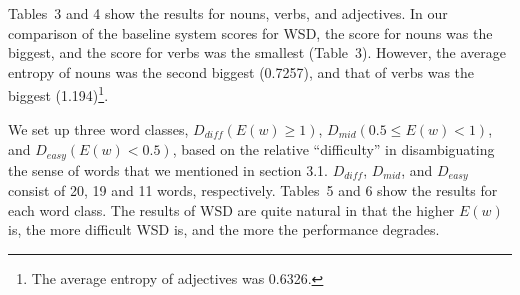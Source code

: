 \documentclass[english]{jnlp_1.4}
\begin{document}
\begin{table}[t]
\begin{minipage}[t]{156pt}
\setlength{\captionwidth}{156pt}

\end{minipage}
\hfill
\begin{minipage}[t]{244pt}
\setlength{\captionwidth}{244pt}

\end{minipage}
\end{table}

Tables~3 and 4 show the results for nouns, verbs, and adjectives.
In our comparison of the baseline system scores for WSD, the score for nouns was the
biggest, and the score for verbs was the smallest (Table~3). However, the
average entropy of nouns was the second biggest (0.7257), and that of
verbs was the biggest (1.194)\footnote{The average entropy of adjectives
was 0.6326.}.

We set up three word classes, $D_{\mathit{diff}} (E(w) \geq 1)$, $D_{mid} (0.5 \leq E(w) <
1)$, and $D_{easy} (E(w) < 0.5)$, based on the relative ``difficulty''
in disambiguating the sense of words that we mentioned in section 3.1.
$D_{\mathit{diff}}$, $D_{mid}$, and $D_{easy}$ consist of 20, 19
and 11 words, respectively. Tables~5 and 6 show the results for each
word class. The results of WSD are quite natural in that the higher $E(w)$
is, the more difficult WSD is, and the more the performance degrades.

\begin{table}[t]
\setlength{\captionwidth}{200pt}
\begin{minipage}[t]{200pt}

\end{minipage}
\hfill
\begin{minipage}[t]{200pt}

\end{minipage}
\end{table}

\begin{table}[t]
\setlength{\captionwidth}{200pt}
\begin{minipage}[t]{200pt}

\end{minipage}
\hfill
\begin{minipage}[t]{200pt}

\end{minipage}
\end{table}
\end{document}
